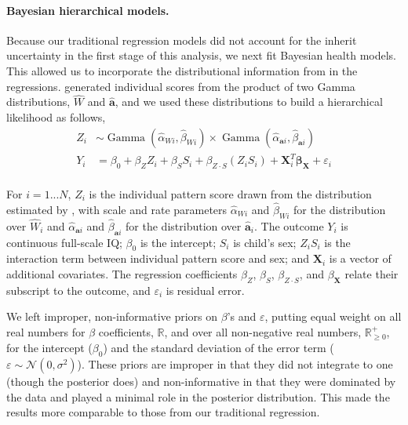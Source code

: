 \paragraph{Bayesian hierarchical models.} Because our traditional regression models did not account for the inherit uncertainty in the first stage of this analysis, we next fit Bayesian health models. This allowed us to incorporate the distributional information from \bnmf in the regressions. \bnmf generated individual scores from the product of two Gamma distributions, $\widehat{W}$ and $\widehat{\mathbf{a}}$, and we used these distributions to build a hierarchical likelihood as follows,
\begin{equation}
\begin{aligned}
Z_i & \sim \operatorname{Gamma}(\widehat{\alpha}_{W i}, \widehat{\beta}_{W i}) 
    \times \operatorname{Gamma}(\widehat{\alpha}_{\mathbf{a} i},
    \widehat{\beta}_{\mathbf{a} i})  \\
Y_i & = \beta_0 + \beta_Z Z_i + \beta_{S} S_i 
+ \beta_{Z \cdot S} \left(Z_i S_i\right) 
+ \mathbf{X}_{i}^T\boldsymbol{\beta}_\mathbf{X} + \varepsilon_i \\
\end{aligned}
\end{equation}

\noindent For $i = 1 ... N$, $Z_i$ is the individual pattern score drawn from the distribution estimated by \bnmfc, with scale and rate parameters $\widehat{\alpha}_{W i}$ and $\widehat{\beta}_{W i}$ for the distribution over $\widehat{W}_i$ and $\widehat{\alpha}_{\mathbf{a} i}$ and $\widehat{\beta}_{\mathbf{a} i}$ for the distribution over $\widehat{\mathbf{a}}_i$. The outcome $Y_i$ is continuous full-scale IQ; $\beta_0$ is the intercept;  $S_i$ is child's sex; $Z_i S_i$ is the interaction term between individual pattern score and sex; and $\mathbf{X}_{i}$ is a vector of additional covariates. The regression coefficients \(\beta_Z\), \(\beta_S\), \(\beta_{Z \cdot S}\), and \(\beta_\mathbf{X}\) relate their subscript to the outcome, and $\varepsilon_i$ is residual error.

We left improper, non-informative priors on $\beta$'s and $\varepsilon$, putting equal weight on all real numbers for $\beta$ coefficients, \(\mathbb R \), and over all non-negative real numbers, \(\mathbb R_{\geq 0}^+\), for the intercept ($\beta_0$) and the standard deviation of the error term ($\varepsilon \sim \mathcal{N}(0,\sigma^2)$). These priors are improper in that they did not integrate to one (though the posterior does) and non-informative in that they were dominated by the data and played a minimal role in the posterior distribution. This made the results more comparable to those from our traditional regression.

